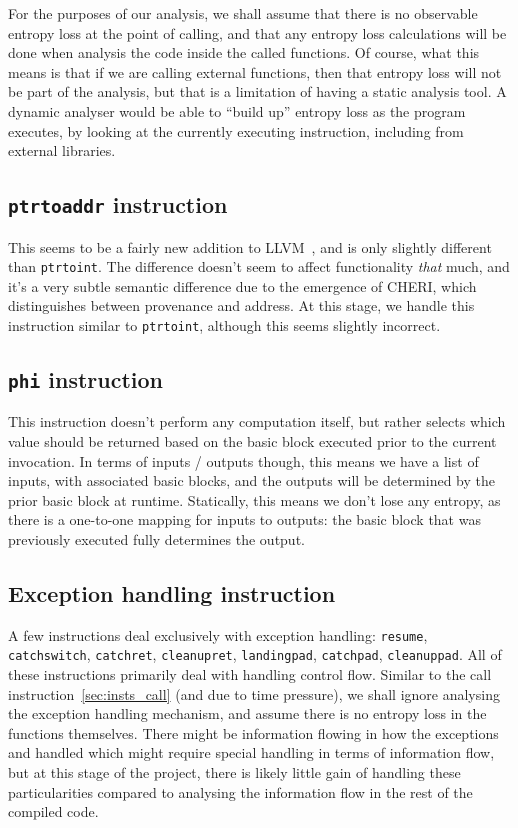 \documentclass[a4paper]{article}
\newcommand{\inst}[1]{\texttt{#1}}
\newcommand{\cmnt}[2]{{\color{red}{\textbf{#1:} #2}}}
\newcommand{\AL}[1]{\cmnt{AL}{#1}}
\begin{document}
For the purposes of our analysis, we shall assume that there is no observable
entropy loss at the point of calling, and that any entropy loss calculations
will be done when analysis the code inside the called functions. Of course,
what this means is that if we are calling external functions, then that entropy
loss will not be part of the analysis, but that is a limitation of having a
static analysis tool. A dynamic analyser would be able to ``build up'' entropy
loss as the program executes, by looking at the currently executing
instruction, including from external libraries.

\subsection{\inst{ptrtoaddr} instruction}
This seems to be a fairly new addition to LLVM~\cite{popov2025thisyear}, and is
only slightly different than \inst{ptrtoint}. The difference doesn't seem to
affect functionality \emph{that} much, and it's a very subtle semantic
difference due to the emergence of CHERI, which distinguishes between
provenance and address. At this stage, we handle this instruction similar to
\inst{ptrtoint}, although this seems slightly incorrect\AL{Discuss}.

\subsection{\inst{phi} instruction}
This instruction doesn't perform any computation itself, but rather selects
which value should be returned based on the basic block executed prior to the
current invocation. In terms of inputs / outputs though, this means we have a
list of inputs, with associated basic blocks, and the outputs will be
determined by the prior basic block at runtime. Statically, this means we don't
lose any entropy, as there is a one-to-one mapping for inputs to outputs: the
basic block that was previously executed fully determines the output.

\subsection{Exception handling instruction}
A few instructions deal exclusively with exception handling: \inst{resume},
\inst{catchswitch}, \inst{catchret}, \inst{cleanupret}, \inst{landingpad},
\inst{catchpad}, \inst{cleanuppad}. All of these instructions primarily deal
with handling control flow. Similar to the call
instruction~\ref{sec:insts_call} (and due to time pressure), we shall ignore
analysing the exception handling mechanism, and assume there is no entropy loss
in the functions themselves. There might be information flowing in how the
exceptions and handled which might require special handling in terms of
information flow, but at this stage of the project, there is likely little gain
of handling these particularities compared to analysing the information flow in
the rest of the compiled code.
\end{document}
